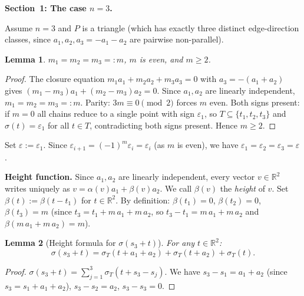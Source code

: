 \documentclass{article}
\newtheorem{lemma}{Lemma}
\begin{document}
\medskip
\noindent\textbf{Section~1: The case $n=3$.}

Assume $n=3$ and $P$ is a triangle (which has exactly three distinct edge-direction
classes, since $a_1,a_2,a_3=-a_1-a_2$ are pairwise non-parallel).

\begin{lemma}\label{lem:n3m}
$m_1=m_2=m_3=:m$, $m$ is even, and $m\ge 2$.
\end{lemma}
\begin{proof}
The closure equation $m_1a_1+m_2a_2+m_3a_3=0$ with $a_3=-(a_1+a_2)$ gives
$(m_1-m_3)a_1+(m_2-m_3)a_2=0$.
Since $a_1,a_2$ are linearly independent, $m_1=m_2=m_3=:m$.
Parity: $3m\equiv 0\pmod{2}$ forces $m$ even.
Both signs present: if $m=0$ all chains reduce to a single point with sign $\varepsilon_1$,
so $T\subseteq\{t_1,t_2,t_3\}$ and $\sigma(t)=\varepsilon_1$ for all $t\in T$,
contradicting both signs present.  Hence $m\ge 2$.
\end{proof}

Set $\varepsilon:=\varepsilon_1$.  Since $\varepsilon_{i+1}=(-1)^m\varepsilon_i=\varepsilon_i$
(as $m$ is even), we have $\varepsilon_1=\varepsilon_2=\varepsilon_3=\varepsilon$.

\medskip
\noindent\textbf{Height function.}
Since $a_1,a_2$ are linearly independent, every vector $v\in\mathbb{R}^2$ writes uniquely as
$v=\alpha(v)a_1+\beta(v)a_2$.  We call $\beta(v)$ the \emph{height} of $v$.
Set $\beta(t):=\beta(t-t_1)$ for $t\in\mathbb{R}^2$.
By definition: $\beta(t_1)=0$, $\beta(t_2)=0$, $\beta(t_3)=m$
(since $t_3=t_1+m\,a_1+m\,a_2$, so $t_3-t_1=m\,a_1+m\,a_2$ and $\beta(m\,a_1+m\,a_2)=m$).

\begin{lemma}[Height formula for $\sigma(s_3+t)$]\label{lem:s3formula}
For any $t\in\mathbb{R}^2$:
\[
  \sigma(s_3+t)
    = \sigma_T(t+a_1+a_2)+\sigma_T(t+a_2)+\sigma_T(t).
\]
\end{lemma}
\begin{proof}
$\sigma(s_3+t)=\sum_{j=1}^3\sigma_T(t+s_3-s_j)$.
We have $s_3-s_1=a_1+a_2$ (since $s_3=s_1+a_1+a_2$), $s_3-s_2=a_2$, $s_3-s_3=0$.
\end{proof}
\end{document}

